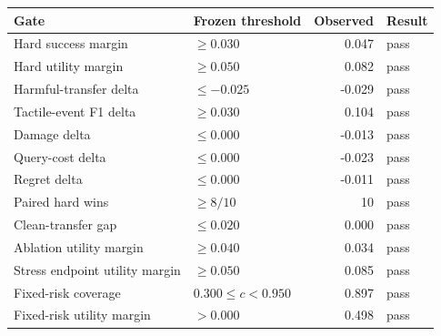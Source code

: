 \begin{tabular}{llrl}
\toprule
Gate & Frozen threshold & Observed & Result \\
\midrule
Hard success margin & $\geq 0.030$ & 0.047 & pass \\
Hard utility margin & $\geq 0.050$ & 0.082 & pass \\
Harmful-transfer delta & $\leq -0.025$ & -0.029 & pass \\
Tactile-event F1 delta & $\geq 0.030$ & 0.104 & pass \\
Damage delta & $\leq 0.000$ & -0.013 & pass \\
Query-cost delta & $\leq 0.000$ & -0.023 & pass \\
Regret delta & $\leq 0.000$ & -0.011 & pass \\
Paired hard wins & $\geq 8/10$ & 10 & pass \\
Clean-transfer gap & $\leq 0.020$ & 0.000 & pass \\
Ablation utility margin & $\geq 0.040$ & 0.034 & pass \\
Stress endpoint utility margin & $\geq 0.050$ & 0.085 & pass \\
Fixed-risk coverage & $0.300 \leq c < 0.950$ & 0.897 & pass \\
Fixed-risk utility margin & $> 0.000$ & 0.498 & pass \\
\bottomrule
\end{tabular}